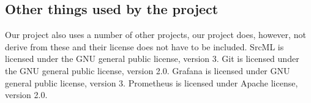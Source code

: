 \documentclass[./Main.tex]{subfiles}
\begin{document}
\tocless\subsection{Other things used by the project}
Our project also uses a number of other projects, our project does, however, not derive from these and their license does not have to be included.
SrcML is licensed under the GNU general public license, version 3. Git is licensed under the GNU general public license, version 2.0. Grafana is licensed under GNU general public license, version 3. Prometheus is licensed under Apache license, version 2.0.
\end{document}
